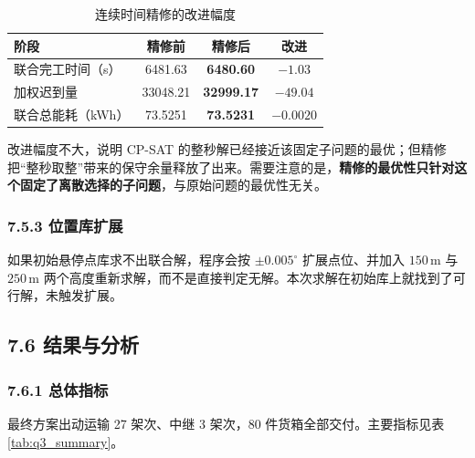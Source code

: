 \documentclass[withoutpreface,bwprint]{format}
\begin{document}
\begin{table}[H]
\centering
\small
\caption{连续时间精修的改进幅度}
\label{tab:q3_refine}
\begin{tabularx}{\textwidth}{l c c c}
\toprule
\textbf{阶段} & \textbf{精修前} & \textbf{精修后} & \textbf{改进} \\
\midrule
联合完工时间（s） & 6481.63 & \textbf{6480.60} & $-1.03$ \\
加权迟到量 & 33048.21 & \textbf{32999.17} & $-49.04$ \\
联合总能耗（kWh） & 73.5251 & \textbf{73.5231} & $-0.0020$ \\
\bottomrule
\end{tabularx}
\end{table}

改进幅度不大，说明 CP-SAT 的整秒解已经接近该固定子问题的最优；但精修把“整秒取整”带来的保守余量释放了出来。需要注意的是，\textbf{精修的最优性只针对这个固定了离散选择的子问题}，与原始问题的最优性无关。

\subsubsection{7.5.3 位置库扩展}
如果初始悬停点库求不出联合解，程序会按 $\pm 0.005^\circ$ 扩展点位、并加入 $150\,\text{m}$ 与 $250\,\text{m}$ 两个高度重新求解，而不是直接判定无解。本次求解在初始库上就找到了可行解，未触发扩展。

\subsection{7.6 结果与分析}

\subsubsection{7.6.1 总体指标}
最终方案出动运输 27 架次、中继 3 架次，80 件货箱全部交付。主要指标见表 \ref{tab:q3_summary}。
\end{document}
